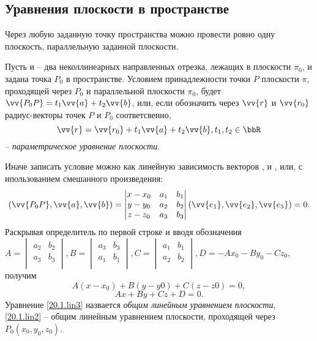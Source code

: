 \subsection{Уравнения плоскости в пространстве}
\begin{axiome}
Через любую заданную точку пространства можно провести ровно одну плоскость, параллельную заданной плоскости.
\end{axiome}

Пусть  и  -- два неколлинеарных направленных отрезка, лежащих в плоскости $\pi_0$, и задана точка $P_0$ в пространстве. Условием принадлежности точки $P$ плоскости $\pi$, проходящей через $P_0$ и параллельной плоскости $\pi_0$, будет $\vv{P_0P}=t_1\vv{a}+t_2\vv{b}$, или, если обозначить через $\vv{r}$ и $\vv{r_0}$ радиус-векторы точек $P$ и $P_0$ соответсвенно,
\begin{equation}\label{20.1.par3}
\vv{r}=\vv{r_0}+t_1\vv{a}+t_2\vv{b}, t_1,t_2 \in \bbR
\end{equation}
-- \textit{параметрическое уравнение плоскости}.

Иначе записать условие можно как линейную зависимость векторов ,  и , или, с ипользованием смешанного произведения:
\begin{equation}\label{20.1.mix1}
(\vv{P_0P},\vv{a}, \vv{b})=\begin{vmatrix}
x-x_0 & a_1 & b_1 \\
y-y_0 & a_2 & b_2 \\
z-z_0 & a_3 & b_3 \\
\end{vmatrix}(\vv{e_1},\vv{e_2},\vv{e_3})=0.
\end{equation}
Раскрывая определитель по первой строке и вводя обозначения $A=\begin{vmatrix}
a_2 & b_2 \\
a_3 & b_3 \\
\end{vmatrix}, B=\begin{vmatrix}
a_3 & b_3 \\
a_1 & b_1 \\
\end{vmatrix}, C=\begin{vmatrix}
a_1 & b_1 \\
a_2 & b_2 \\
\end{vmatrix}, D=-Ax_0-By_0-Cz_0$, получим
\begin{equation}\label{20.1.lin2}
A(x-x_0)+B(y-y0)+C(z-z0)=0,
\end{equation}
\begin{equation}\label{20.1.lin3}
Ax+By+Cz+D=0.
\end{equation}
Уравнение \ref{20.1.lin3} назвается \textit{общим линейным уравнением плоскости}, \ref{20.1.lin2} -- общим линейным уравнением плоскости, проходящей через $P_0(x_0,y_0,z_0)$.

